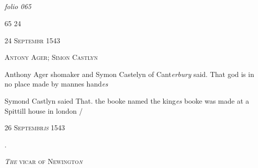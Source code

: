 \documentclass[12pt, a4paper]{book}
\begin{document}
            
            
\dotfill
					  \subsection*{}

\textit{folio 065}


\begin{flushright}{\color{Mahogany}65} 24\end{flushright} 

               
				\begin{center} \begin{large} {\scshape 
                  24 Septembr 1543
               } \end{large} \end{center}
			
               
               	
				\begin{center}  {\scshape Antony Ager; Simon Castlyn}  \end{center}
			
               	
               		
		\ifthenelse{\isodd{\thepage}}
		{\reversemarginpar}
		{\normalmarginpar}
		Anthony Ager shomaker and Symon Castelyn of Cant\textit{erbury}
 said. That god is in no place made by mannes hand\textit{es}
               	
		\ifthenelse{\isodd{\thepage}}
		{\reversemarginpar}
		{\normalmarginpar}
		Symond Castlyn saied That. the booke named
               	the king\textit{es} booke was made at a Spittill house in
               		london /
               	
 

            
            
               
				\begin{center} \begin{large} {\scshape 
                  26 Septembr\textit{is} 1543
               } \end{large} \end{center}
			
.
 

                  
				\begin{center}  {\scshape 
                     \textit{The} vicar of Newingto\textit{n}
                  }  \end{center}
			
\end{document}
